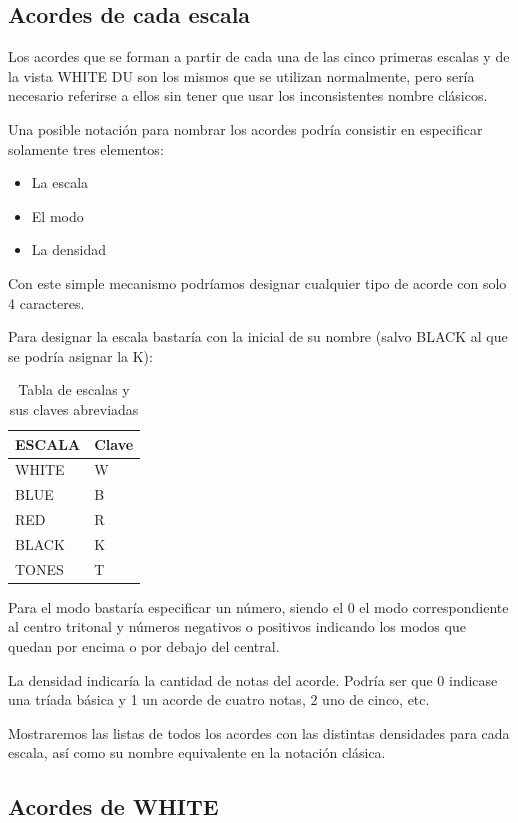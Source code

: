 \documentclass[]{report}
\begin{document}
\subsection{Acordes de cada escala}

Los acordes que se forman a partir de cada una de las cinco primeras escalas y de la vista \textsf{WHITE DU} son los mismos que se utilizan normalmente, pero sería necesario referirse a ellos sin tener que usar los inconsistentes nombre clásicos.

Una posible notación para nombrar los acordes podría consistir en especificar solamente tres elementos:
\begin{itemize}
	\item La escala
	\item El modo
	\item La densidad
\end{itemize}
Con este simple mecanismo podríamos designar cualquier tipo de acorde con solo 4 caracteres.

Para designar la escala bastaría con la inicial de su nombre (salvo \textsf{BLACK} al que se podría asignar la \textsf{K}):
\begin{table}[H]
	\centering
	\begin{tabular}{ll}
		\toprule
		ESCALA         & Clave \\
		\midrule
		\textsf{WHITE} & W     \\
		\textsf{BLUE}  & B     \\
		\textsf{RED}   & R     \\
		\textsf{BLACK} & K     \\
		\textsf{TONES} & T     \\
		\bottomrule
	\end{tabular}
	\caption{Tabla de escalas y sus claves abreviadas}\label{tab:scales-and-keys}
\end{table}

Para el modo bastaría especificar un número, siendo el 0 el modo correspondiente al centro tritonal y números negativos o positivos indicando los modos que quedan por encima o por debajo del central.

La densidad indicaría la cantidad de notas del acorde. Podría ser que 0 indicase una tríada básica y 1 un acorde de cuatro notas, 2 uno de cinco, etc.

Mostraremos las listas de todos los acordes con las distintas densidades para cada escala, así como su nombre equivalente en la notación clásica.
\subsection*{Acordes de WHITE}
\end{document}
